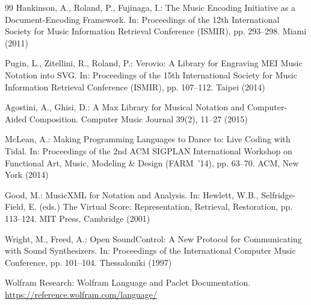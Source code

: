 \documentclass[runningheads,a4paper]{llncs}
\begin{document}
\begin{thebibliography}{99}
 Hankinson, A., Roland, P., Fujinaga, I.: The Music Encoding
Initiative as a Document-Encoding Framework. In: Proceedings of the 12th
International Society for Music Information Retrieval Conference (ISMIR),
pp. 293--298. Miami (2011)

 Pugin, L., Zitellini, R., Roland, P.: Verovio: A Library
for Engraving MEI Music Notation into SVG. In: Proceedings of the 15th
International Society for Music Information Retrieval Conference (ISMIR),
pp. 107--112. Taipei (2014)

 Agostini, A., Ghisi, D.: A Max Library for Musical Notation
and Computer-Aided Composition. Computer Music Journal 39(2), 11--27 (2015)

 McLean, A.: Making Programming Languages to Dance to: Live
Coding with Tidal. In: Proceedings of the 2nd ACM SIGPLAN International
Workshop on Functional Art, Music, Modeling \& Design (FARM~'14), pp. 63--70.
ACM, New York (2014)

 Good, M.: MusicXML for Notation and Analysis. In: Hewlett,
W.B., Selfridge-Field, E. (eds.) The Virtual Score: Representation,
Retrieval, Restoration, pp. 113--124. MIT Press, Cambridge (2001)

 Wright, M., Freed, A.: Open SoundControl: A New Protocol for
Communicating with Sound Synthesizers. In: Proceedings of the International
Computer Music Conference, pp. 101--104. Thessaloniki (1997)

 Wolfram Research: Wolfram Language and Paclet
Documentation. \url{https://reference.wolfram.com/language/}

\end{thebibliography}
\end{document}
